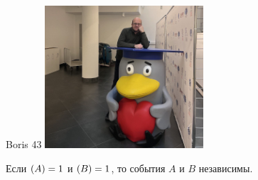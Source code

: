 \documentclass[12pt]{article}
\let\P\relax
\DeclareMathOperator{\P}{\mathbb{P}}
\begin{document}
\begin{minipage}{0.45\textwidth}
\begin{tinderm}{Boris 43}
\includegraphics[width=\textwidth]{tinder-photo/boris.png}

  

\begin{mybox}
Если $\P(A) = 1$ и $\P(B)=1$, то события $A$ и $B$ независимы.
\end{mybox}
\end{tinderm}
\end{minipage}
%
%
\end{document}
